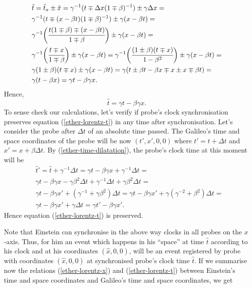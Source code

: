 \documentclass[main.tex]{subfiles}
\begin{document}
\begin{align*}
& \hat{t} = \hat{t}_a \pm \hat{x} = \gamma^{-1}(t \mp \Delta x (1 \mp \beta)^{-1}) \pm \gamma \Delta x = \\
& \gamma^{-1}(t \mp (x - \beta t) (1 \mp \beta)^{-1}) \pm \gamma (x - \beta t) = \\
& \gamma^{-1}\bigg( \cfrac{t(1 \mp \beta) \mp (x - \beta t)}{1 \mp \beta} \bigg) \pm \gamma (x - \beta t) = \\
& \gamma^{-1}\bigg( \cfrac{t \mp x}{1 \mp \beta} \bigg) \pm \gamma (x - \beta t) = 
\gamma^{-1}\bigg( \cfrac{(1 \pm \beta)(t \mp x)}{1 - \beta^2} \bigg) \pm \gamma (x - \beta t) = 
\\
& \gamma(1 \pm \beta)(t \mp x) \pm \gamma (x - \beta t) = \gamma(t \pm \beta t - \beta x \mp x \pm x \mp \beta t) = \\
& \gamma( t - \beta x) = \gamma t - \beta\gamma x.
\end{align*}
Hence,
\begin{equation}
\label{ether-lorentz-t}
\hat{t} = \gamma t - \beta\gamma x.
\end{equation}
To sense check our calculations, let's verify if probe's clock synchronisation preserves equation (\ref{ether-lorentz-t}) in any time after synchronisation. Let's consider the probe after $\Delta t$ of an absolute time passed. The Galileo's time and space coordinates of the probe will be now $(t', x', 0, 0)$ where $t' = t + \Delta t$ and $x' = x + \beta \Delta t$. By (\ref{ether-time-dilatation}), the probe's clock time at this moment will be
\begin{align*}
& \hat{t}' = \hat{t} + \gamma^{-1}\Delta t = \gamma t - \beta\gamma x + \gamma^{-1}\Delta t =  \\
& \gamma t - \beta\gamma x - \gamma\beta^2\Delta t + \gamma^{-1}\Delta t + \gamma\beta^2\Delta t = \\
& \gamma t - \beta\gamma x' + (\gamma^{-1} + \gamma\beta^2)\Delta t = \gamma t - \beta\gamma x' + \gamma(\gamma^{-2} + \beta^2)\Delta t  = \\
& \gamma t - \beta\gamma x' + \gamma\Delta t = \gamma t' - \beta\gamma x'.
\end{align*}
Hence equation (\ref{ether-lorentz-t}) is preserved.

Note that Einstein can synchronise in the above way clocks in all probes on the $x$-axis. Thus, for him an event which happens in his ``space'' at time $\hat{t}$ according to his clock and at his coordinates $(\hat{x}, 0, 0)$, will be an event registered by probe with coordinates $(\hat{x}, 0, 0)$ at synchronised probe's clock time $\hat{t}$. If we summarise now the relations (\ref{ether-lorentz-x}) and (\ref{ether-lorentz-t}) between Einstein's time and space coordinates and Galileo's time and space coordinates, we get
\end{document}
